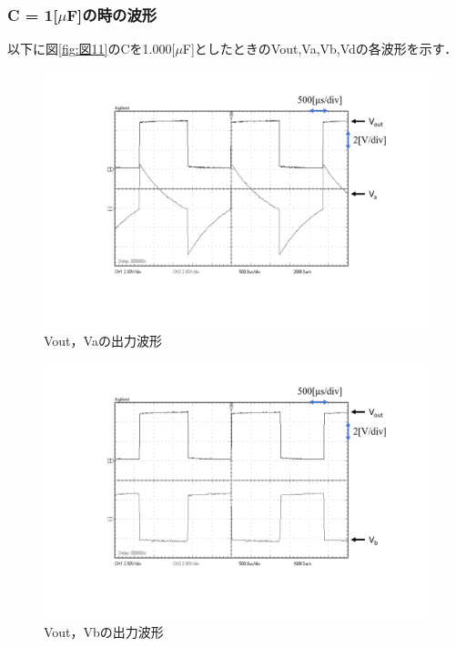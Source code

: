 \documentclass[10pt, a4j, dvipdfmx]{jarticle}
\makeatletter
\newcommand{\figcaption}[1]{\def\@captype{figure}\caption{#1}}
\makeatother
\begin{document}
\subsubsection{C = 1[$\mu$F]の時の波形}
以下に図\ref{fig:図11}のCを1.000[$\mu$F]としたときのVout,Va,Vb,Vdの各波形を示す．
\begin{figure}[H]
	\centering
	\includegraphics[width=\hsize]{images/r105m-Vout-Va.png}
	\figcaption{Vout，Vaの出力波形}
	\label{r105m-Vout-Va}
\end{figure}
\begin{figure}[H]
	\centering
	\includegraphics[width=\hsize]{images/r105m-Vout-Vb.png}
	\figcaption{Vout，Vbの出力波形}
	\label{r105m-Vout-Vb}
\end{figure}
\end{document}
